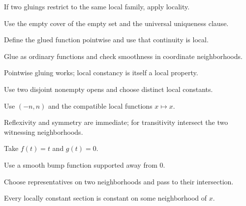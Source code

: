 \begin{hint}
If two gluings restrict to the same local family, apply locality.
\end{hint}

\begin{hint}
Use the empty cover of the empty set and the universal uniqueness clause.
\end{hint}

\begin{hint}
Define the glued function pointwise and use that continuity is local.
\end{hint}

\begin{hint}
Glue as ordinary functions and check smoothness in coordinate neighborhoods.
\end{hint}

\begin{hint}
Pointwise gluing works; local constancy is itself a local property.
\end{hint}

\begin{hint}
Use two disjoint nonempty opens and choose distinct local constants.
\end{hint}

\begin{hint}
Use $(-n,n)$ and the compatible local functions $x\mapsto x$.
\end{hint}

\begin{hint}
Reflexivity and symmetry are immediate; for transitivity intersect the two witnessing neighborhoods.
\end{hint}

\begin{hint}
Take $f(t)=t$ and $g(t)=0$.
\end{hint}

\begin{hint}
Use a smooth bump function supported away from $0$.
\end{hint}

\begin{hint}
Choose representatives on two neighborhoods and pass to their intersection.
\end{hint}

\begin{hint}
Every locally constant section is constant on some neighborhood of $x$.
\end{hint}


